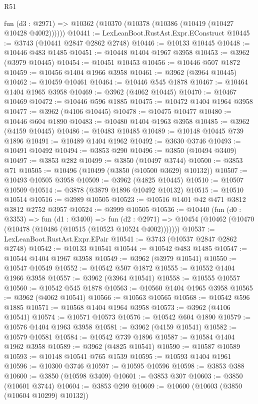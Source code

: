 \begin{lexlean}{R51}
\begin{coremodule}
    fun (d3 : @2971) => @10362 (@10370 (@10378 (@10386 (@10419 (@10427 @10428 @4002))))))
@10441 := LexLeanBoot.RustAst.Expr.EConstruct
@10445 := @3743 (@10441 @2847 @2862 @2748)
@10446 := @10133 @10445
@10448 := @10446 @483 @1485
@10451 := @10448 @1404 @1967 @3958
@10453 := @3962 (@3979 @10445)
@10454 := @10451 @10453
@10456 := @10446 @507 @1872
@10459 := @10456 @1404 @1966 @3958
@10461 := @3962 (@3964 @10445)
@10462 := @10459 @10461
@10464 := @10446 @545 @1878
@10467 := @10464 @1404 @1965 @3958
@10469 := @3962 (@4062 @10445)
@10470 := @10467 @10469
@10472 := @10446 @596 @1885
@10475 := @10472 @1404 @1964 @3958
@10477 := @3962 (@4106 @10445)
@10478 := @10475 @10477
@10480 := @10446 @604 @1890
@10483 := @10480 @1404 @1963 @3958
@10485 := @3962 (@4159 @10445)
@10486 := @10483 @10485
@10489 := @10148 @10445 @739 @1896
@10491 := @10489 @1404 @1962
@10492 := @3630 @3746
@10493 := @10491 @10492
@10494 := @3853 @290
@10496 := @3850 (@10494 @3409)
@10497 := @3853 @282
@10499 := @3850 (@10497 @3744)
@10500 := @3853 @71
@10505 := @10496 (@10499 (@3850 (@10500 @3629) @10132))
@10507 := @10493 @10505 @3958
@10509 := @3962 (@4825 @10445)
@10510 := @10507 @10509
@10514 := @3878 (@3879 @1896 @10492 @10132)
@10515 := @10510 @10514
@10516 := @3989 @10505
@10523 := @10516 @1401 @42 @471 @3812 @3812 @2752 @3957
@10524 := @3999 @10505
@10536 := @10440
    (fun (d0 : @3353) =>
    fun (d1 : @3400) =>
    fun (d2 : @2971) => @10454 (@10462 (@10470 (@10478 (@10486 (@10515 (@10523 @10524 @4002)))))))
@10537 := LexLeanBoot.RustAst.Expr.EPair
@10541 := @3743 (@10537 @2847 @2862 @2748)
@10542 := @10133 @10541
@10544 := @10542 @483 @1485
@10547 := @10544 @1404 @1967 @3958
@10549 := @3962 (@3979 @10541)
@10550 := @10547 @10549
@10552 := @10542 @507 @1872
@10555 := @10552 @1404 @1966 @3958
@10557 := @3962 (@3964 @10541)
@10558 := @10555 @10557
@10560 := @10542 @545 @1878
@10563 := @10560 @1404 @1965 @3958
@10565 := @3962 (@4062 @10541)
@10566 := @10563 @10565
@10568 := @10542 @596 @1885
@10571 := @10568 @1404 @1964 @3958
@10573 := @3962 (@4106 @10541)
@10574 := @10571 @10573
@10576 := @10542 @604 @1890
@10579 := @10576 @1404 @1963 @3958
@10581 := @3962 (@4159 @10541)
@10582 := @10579 @10581
@10584 := @10542 @739 @1896
@10587 := @10584 @1404 @1962 @3958
@10589 := @3962 (@4825 @10541)
@10590 := @10587 @10589
@10593 := @10148 @10541 @765 @1539
@10595 := @10593 @1404 @1961
@10596 := @10300 @3746
@10597 := @10595 @10596
@10598 := @3853 @388
@10600 := @3850 (@10598 @3409)
@10601 := @3853 @307
@10603 := @3850 (@10601 @3744)
@10604 := @3853 @299
@10609 := @10600 (@10603 (@3850 (@10604 @10299) @10132))

\end{coremodule}
\end{lexlean}
